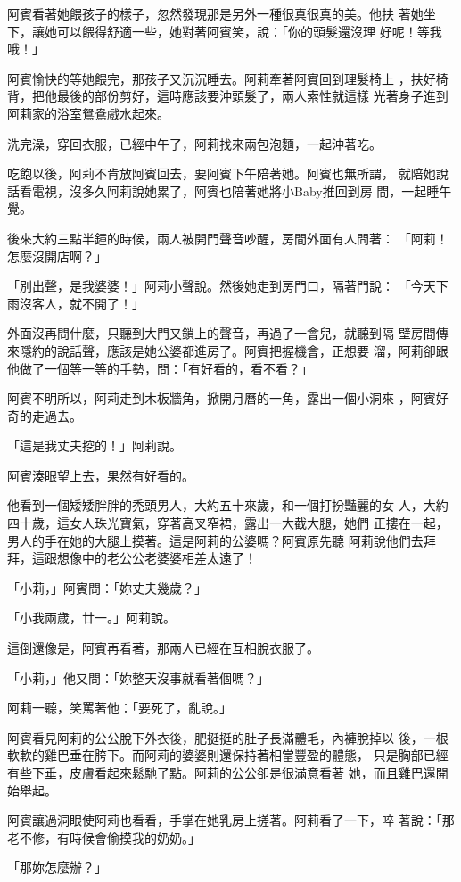 阿賓看著她餵孩子的樣子，忽然發現那是另外一種很真很真的美。他扶
著她坐下，讓她可以餵得舒適一些，她對著阿賓笑，說：「你的頭髮還沒理
好呢！等我哦！」

阿賓愉快的等她餵完，那孩子又沉沉睡去。阿莉牽著阿賓回到理髮椅上
，扶好椅背，把他最後的部份剪好，這時應該要沖頭髮了，兩人索性就這樣
光著身子進到阿莉家的浴室鴛鴦戲水起來。

洗完澡，穿回衣服，已經中午了，阿莉找來兩包泡麵，一起沖著吃。

吃飽以後，阿莉不肯放阿賓回去，要阿賓下午陪著她。阿賓也無所謂，
就陪她說話看電視，沒多久阿莉說她累了，阿賓也陪著她將小Baby推回到房
間，一起睡午覺。

後來大約三點半鐘的時候，兩人被開門聲音吵醒，房間外面有人問著：
「阿莉！怎麼沒開店啊？」

「別出聲，是我婆婆！」阿莉小聲說。然後她走到房門口，隔著門說：
「今天下雨沒客人，就不開了！」

外面沒再問什麼，只聽到大門又鎖上的聲音，再過了一會兒，就聽到隔
壁房間傳來隱約的說話聲，應該是她公婆都進房了。阿賓把握機會，正想要
溜，阿莉卻跟他做了一個等一等的手勢，問：「有好看的，看不看？」

阿賓不明所以，阿莉走到木板牆角，掀開月曆的一角，露出一個小洞來
，阿賓好奇的走過去。

「這是我丈夫挖的！」阿莉說。

阿賓湊眼望上去，果然有好看的。

他看到一個矮矮胖胖的禿頭男人，大約五十來歲，和一個打扮豔麗的女
人，大約四十歲，這女人珠光寶氣，穿著高叉窄裙，露出一大截大腿，她們
正摟在一起，男人的手在她的大腿上摸著。這是阿莉的公婆嗎？阿賓原先聽
阿莉說他們去拜拜，這跟想像中的老公公老婆婆相差太遠了！

「小莉，」阿賓問：「妳丈夫幾歲？」

「小我兩歲，廿一。」阿莉說。

這倒還像是，阿賓再看著，那兩人已經在互相脫衣服了。

「小莉，」他又問：「妳整天沒事就看著個嗎？」

阿莉一聽，笑罵著他：「要死了，亂說。」

阿賓看見阿莉的公公脫下外衣後，肥挺挺的肚子長滿體毛，內褲脫掉以
後，一根軟軟的雞巴垂在胯下。而阿莉的婆婆則還保持著相當豐盈的體態，
只是胸部已經有些下垂，皮膚看起來鬆馳了點。阿莉的公公卻是很滿意看著
她，而且雞巴還開始舉起。

阿賓讓過洞眼使阿莉也看看，手掌在她乳房上搓著。阿莉看了一下，啐
著說：「那老不修，有時候會偷摸我的奶奶。」

「那妳怎麼辦？」

